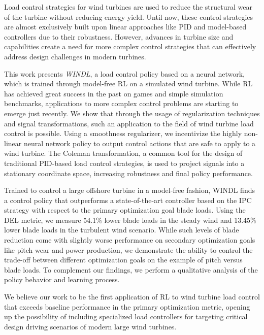 Load control strategies for wind turbines are used to reduce the structural wear of the turbine without reducing energy yield. Until now, these control strategies are almost exclusively built upon linear approaches like PID and model-based controllers due to their robustness. However, advances in turbine size and capabilities create a need for more complex control strategies that can effectively address design challenges in modern turbines.

This work presents \textit{WINDL}, a load control policy based on a neural network, which is trained through model-free \acf{RL} on a simulated wind turbine.
While RL has achieved great success in the past on games and simple simulation benchmarks, applications to more complex control problems are starting to emerge just recently. 
We show that through the usage of regularization techniques and signal transformations, such an application to the field of wind turbine load control is possible.
Using a smoothness regularizer, we incentivize the highly non-linear neural network policy to output control actions that are safe to apply to a wind turbine.
The Coleman transformation, a common tool for the design of traditional PID-based load control strategies, is used to project signals into a stationary coordinate space, increasing robustness and final policy performance. 

Trained to control a large offshore turbine in a model-free fashion, WINDL finds a control policy that outperforms a state-of-the-art controller based on the \acs{IPC} strategy with respect to the primary optimization goal blade loads. Using the \acs{DEL} metric, we measure 54.1\% lower blade loads in the steady wind and 13.45\% lower blade loads in the turbulent wind scenario. While such levels of blade reduction come with slightly worse performance on secondary optimization goals like pitch wear and power production, we demonstrate the ability to control the trade-off between different optimization goals on the example of pitch versus blade loads. To complement our findings, we perform a qualitative analysis of the policy behavior and learning process.


We believe our work to be the first application of \ac{RL} to wind turbine load control that exceeds baseline performance in the primary optimization metric, opening up the possibility of including specialized load controllers for targeting critical design driving scenarios of modern large wind turbines.